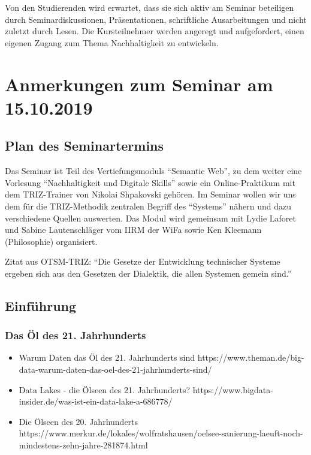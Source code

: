 \documentclass[11pt,a4paper]{article}
\begin{document}
Von den Studierenden wird erwartet, dass sie sich aktiv am Seminar beteiligen
durch Seminardiskussionen, Präsentationen, schriftliche Ausarbeitungen und
nicht zuletzt durch Lesen. Die Kursteilnehmer werden angeregt und
aufgefordert, einen eigenen Zugang zum Thema Nachhaltigkeit zu entwickeln.
\section{Anmerkungen zum Seminar am
15.10.2019}\label{anmerkungen-zum-seminar-am-15.10.2019}

\subsection{Plan des Seminartermins}\label{plan-des-seminartermins}

Das Seminar ist Teil des Vertiefungsmoduls ``Semantic Web'', zu dem
weiter eine Vorlesung ``Nachhaltigkeit und Digitale Skills'' sowie ein
Online-Praktikum mit dem TRIZ-Trainer von Nikolai Shpakovski gehören. Im
Seminar wollen wir uns dem für die TRIZ-Methodik zentralen Begriff des
``Systems'' nähern und dazu verschiedene Quellen auswerten. Das Modul
wird gemeinsam mit Lydie Laforet und Sabine Lautenschläger vom IIRM der
WiFa sowie Ken Kleemann (Philosophie) organisiert.

Zitat aus OTSM-TRIZ: ``Die Gesetze der Entwicklung technischer Systeme
ergeben sich aus den Gesetzen der Dialektik, die allen Systemen gemein
sind.''

\subsection{Einführung}

\subsubsection{Das Öl des 21. Jahrhunderts}

\begin{itemize}
[noitemsep]
\item
  Warum Daten das Öl des 21. Jahrhunderts sind
  https://www.theman.de/big-data-warum-daten-das-oel-des-21-jahrhunderts-sind/
\item
  Data Lakes - die Ölseen des 21. Jahrhunderts?
  https://www.bigdata-insider.de/was-ist-ein-data-lake-a-686778/
\item
  Die Ölseen des 20. Jahrhunderts
  https://www.merkur.de/lokales/wolfratshausen/oelsee-sanierung-laeuft-noch-mindestens-zehn-jahre-281874.html
\end{itemize}
\end{document}
